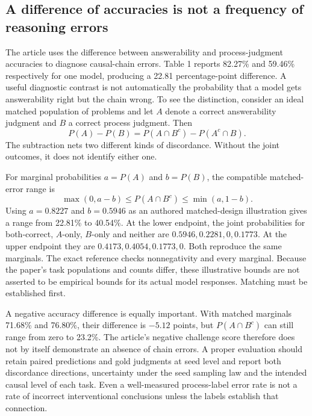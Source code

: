 \subsection{A difference of accuracies is not a frequency of reasoning errors}
\label{exec21:check-paired}
The article uses the difference between answerability and process-judgment accuracies to diagnose causal-chain errors. Table 1 reports 82.27\% and 59.46\% respectively for one model, producing a 22.81 percentage-point difference. A useful diagnostic contrast is not automatically the probability that a model gets answerability right but the chain wrong. To see the distinction, consider an ideal matched population of problems and let $A$ denote a correct answerability judgment and $B$ a correct process judgment. Then
\begin{equation}
 P(A)-P(B)=P(A\cap B^c)-P(A^c\cap B).
 \label{exec21:check-difference}
\end{equation}
The subtraction nets two different kinds of discordance. Without the joint outcomes, it does not identify either one.~\citep{exec21_causalitycheck,exec21_causalitycheck_reference}

For marginal probabilities $a=P(A)$ and $b=P(B)$, the compatible matched-error range is
\begin{equation}
 \max(0,a-b)\leq P(A\cap B^c)\leq\min(a,1-b).
 \label{exec21:check-bounds}
\end{equation}
Using $a=0.8227$ and $b=0.5946$ as an authored matched-design illustration gives a range from 22.81\% to 40.54\%. At the lower endpoint, the joint probabilities for both-correct, $A$-only, $B$-only and neither are $0.5946,0.2281,0,0.1773$. At the upper endpoint they are $0.4173,0.4054,0.1773,0$. Both reproduce the same marginals. The exact reference checks nonnegativity and every marginal. Because the paper's task populations and counts differ, these illustrative bounds are not asserted to be empirical bounds for its actual model responses. Matching must be established first.~\citep{exec21_causalitycheck_reference}

A negative accuracy difference is equally important. With matched marginals 71.68\% and 76.80\%, their difference is $-5.12$ points, but $P(A\cap B^c)$ can still range from zero to 23.2\%. The article's negative challenge score therefore does not by itself demonstrate an absence of chain errors. A proper evaluation should retain paired predictions and gold judgments at seed level and report both discordance directions, uncertainty under the seed sampling law and the intended causal level of each task. Even a well-measured process-label error rate is not a rate of incorrect interventional conclusions unless the labels establish that connection.~\citep{exec21_causalitycheck,exec21_causalitycheck_reference}

